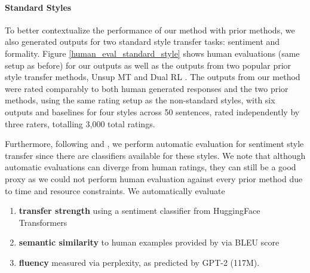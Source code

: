 \paragraph{Standard Styles}
To better contextualize the performance of our method with prior methods, we also generated outputs for two standard style transfer tasks: sentiment and formality. 
Figure \ref{human_eval_standard_style} shows human evaluations (same setup as before) for our outputs as well as the outputs from two popular prior style transfer methods, Unsup MT \citep{prabhumoye-etal-2018-style} and Dual RL \citep{DBLP:conf/ijcai/LuoLZYCSS19}.
The outputs from our method were rated comparably to both human generated responses and the two prior methods, using the same rating setup as the non-standard styles, with six outputs and baselines for four styles across 50 sentences, rated independently by three raters, totalling 3,000 total ratings.

Furthermore, following \citet{li-etal-2018-delete} and \citet{sudhakar-etal-2019-transforming}, we perform automatic evaluation for sentiment style transfer since there are classifiers available for these styles. We note that although automatic evaluations can diverge from human ratings, they can still be a good proxy as we could not perform human evaluation against every prior method due to time and resource constraints.
We automatically evaluate 
\begin{enumerate}
    \item \textbf{transfer strength} using a sentiment classifier from HuggingFace Transformers \citep{wolf-etal-2020-transformers}
    \item \textbf{semantic similarity} to human examples provided by \citet{DBLP:conf/ijcai/LuoLZYCSS19} via BLEU score
    \item \textbf{fluency} measured via perplexity, as predicted by GPT-2 (117M).
\end{enumerate}

